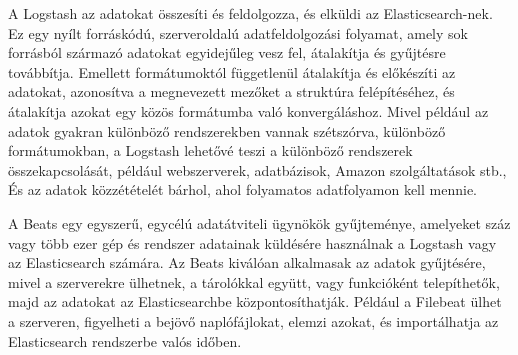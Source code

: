 A Logstash az adatokat összesíti és feldolgozza, és elküldi az Elasticsearch-nek. Ez egy nyílt forráskódú, szerveroldalú adatfeldolgozási folyamat, amely sok forrásból származó adatokat egyidejűleg vesz fel, átalakítja és gyűjtésre továbbítja. Emellett formátumoktól függetlenül átalakítja és előkészíti az adatokat, azonosítva a megnevezett mezőket a struktúra felépítéséhez, és átalakítja azokat egy közös formátumba való konvergáláshoz. Mivel például az adatok gyakran különböző rendszerekben vannak szétszórva, különböző formátumokban, a Logstash lehetővé teszi a különböző rendszerek összekapcsolását, például webszerverek, adatbázisok, Amazon szolgáltatások stb., És az adatok közzétételét bárhol, ahol folyamatos adatfolyamon kell mennie.

A Beats egy egyszerű, egycélú adatátviteli ügynökök gyűjteménye, amelyeket száz vagy több ezer gép és rendszer adatainak küldésére használnak a Logstash vagy az Elasticsearch számára. Az Beats kiválóan alkalmasak az adatok gyűjtésére, mivel a szerverekre ülhetnek, a tárolókkal együtt, vagy funkcióként telepíthetők, majd az adatokat az Elasticsearchbe központosíthatják. Például a Filebeat ülhet a szerveren, figyelheti a bejövő naplófájlokat, elemzi azokat, és importálhatja az Elasticsearch rendszerbe valós időben.